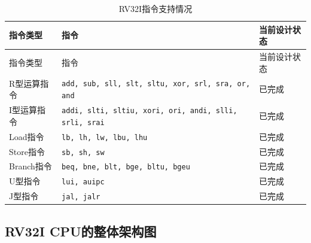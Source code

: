 \documentclass[12pt,a4paper]{ctexart}
\newcommand{\code}[1]{\texttt{#1}}
\begin{document}
\begin{longtable}{p{3cm}p{8cm}p{3cm}}
	\caption{RV32I指令支持情况}                                                           \\
	\toprule
	指令类型     & 指令                                                          & 当前设计状态 \\
	\midrule
	\endfirsthead
	\toprule
	指令类型     & 指令                                                          & 当前设计状态 \\
	\midrule
	\endhead
	R型运算指令   & \code{add, sub, sll, slt, sltu, xor, srl, sra, or, and}     & 已完成    \\
	I型运算指令   & \code{addi, slti, sltiu, xori, ori, andi, slli, srli, srai} & 已完成    \\
	Load指令   & \code{lb, lh, lw, lbu, lhu}                                 & 已完成    \\
	Store指令  & \code{sb, sh, sw}                                           & 已完成    \\
	Branch指令 & \code{beq, bne, blt, bge, bltu, bgeu}                       & 已完成    \\
	U型指令     & \code{lui, auipc}                                           & 已完成    \\
	J型指令     & \code{jal, jalr}                                            & 已完成    \\
	\bottomrule
\end{longtable}

\subsection{RV32I CPU的整体架构图}
\end{document}
